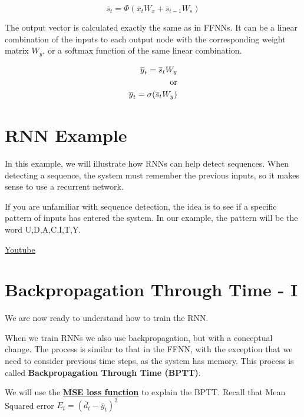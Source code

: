 \begin{equation}
    \overline{s}_t = \Phi(\overline{x}_t W_x + \overline{s}_{t-1} W_s)
\end{equation}

The output vector is calculated exactly the same as in FFNNs. It can be a linear combination of the inputs to each output node with the corresponding weight matrix \(W_y\), or a softmax function of the same linear combination.

\begin{equation}
    \begin{split}
        \overline{y}_t = \overline{s}_t W_y \\
        \textnormal{or} \\
        \overline{y}_t = \sigma(\overline{s}_t W_y)
    \end{split}  
\end{equation}

\section{RNN Example}

In this example, we will illustrate how RNNs can help detect sequences. When detecting a sequence, the system must remember the previous inputs, so it makes sense to use a recurrent network. \newline

If you are unfamiliar with sequence detection, the idea is to see if a specific pattern of inputs has entered the system. In our example, the pattern will be the word U,D,A,C,I,T,Y. \newline

\href{https://www.youtube.com/watch?v=MDLk3fhpTx0&ab_channel=Udacity}{Youtube} 


\section{Backpropagation Through Time - I}

We are now ready to understand how to train the RNN.

When we train RNNs we also use backpropagation, but with a conceptual change. The process is similar to that in the FFNN, with the exception that we need to consider previous time steps, as the system has memory. This process is called \textbf{Backpropagation Through Time (BPTT)}.

We will use the \href{https://en.wikipedia.org/wiki/Mean_squared_error}{\textbf{MSE loss function}} to explain the BPTT. Recall that Mean Squared error \(E_t = (\overline{d}_t - \overline{y}_t)^2\)

